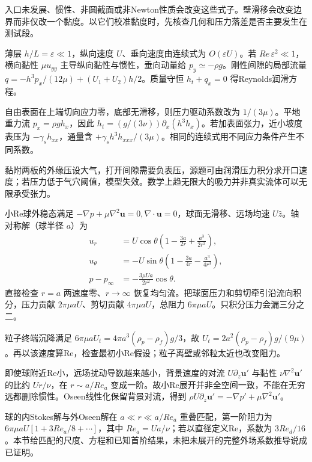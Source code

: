 入口未发展、惯性、非圆截面或非Newton性质会改变这些式子。壁滑移会改变边界而非仅改一个黏度。以它们校准黏度时，先核查几何和压力落差是否主要发生在测试段。

薄层 $h/L=\varepsilon\ll1$，纵向速度 $U$、垂向速度由连续式为 $O(\varepsilon U)$。若 $Re\,\varepsilon^2\ll1$，横向黏性 $\mu u_{yy}$ 主导纵向黏性与惯性，垂向动量给 $p_y\simeq-\rho g$。刚性间隙的局部流量 $q=-h^3p_x/(12\mu)+(U_1+U_2)h/2$。质量守恒 $h_t+q_x=0$ 得Reynolds润滑方程。

自由表面在上端切向应力零，底部无滑移，则压力驱动系数改为 $1/(3\mu)$。平地重力流 $p_x=\rho gh_x$，因此 $h_t=(g/(3\nu))\partial_x(h^3h_x)$。若加表面张力，近小坡度表压为 $-\gamma_sh_{xx}$，通量含 $+\gamma_sh^3h_{xxx}/(3\mu)$。相同的连续式用不同应力条件产生不同系数。

黏附两板的外缘压设大气，打开间隙需要负表压，源题可由润滑压力积分求开口速度；若压力低于气穴阈值，模型失效。数学上趋无限大的吸力并非真实流体可以无限承受张力。

小Re球外稳态满足 $-\nabla p+\mu\nabla^2\mathbf u=0,\nabla\cdot\mathbf u=0$，球面无滑移、远场均速 $U\hat z$。轴对称解（球半径 $a$）为
\begin{align*}
u_r&=U\cos\theta\left(1-\frac{3a}{2r}+\frac{a^3}{2r^3}\right),\\
u_\theta&=-U\sin\theta\left(1-\frac{3a}{4r}-\frac{a^3}{4r^3}\right),\\
p-p_\infty&=-\frac{3\mu Ua}{2r^2}\cos\theta.
\end{align*}
直接检查 $r=a$ 两速度零、$r\to\infty$ 恢复均匀流。把球面压力和剪切牵引沿流向积分，压力贡献 $2\pi\mu aU$、剪切贡献 $4\pi\mu aU$，总阻力 $6\pi\mu aU$。只积分压力会漏三分之二。

粒子终端沉降满足 $6\pi\mu aU_t=4\pi a^3(\rho_p-\rho_f)g/3$，故 $U_t=2a^2(\rho_p-\rho_f)g/(9\mu)$。再以该速度算Re，检查最初小Re假设；粒子离壁或邻粒太近也改变阻力。

即使球附近Re小，远场扰动导数越来越小，背景速度的对流 $U\partial_z\mathbf u'$ 与黏性 $\nu\nabla^2\mathbf u'$ 的比约 $Ur/\nu$，在 $r\sim a/Re_a$ 变成一阶。故小Re展开并非全空间一致，不能在无穷远都删除惯性。Oseen线性化保留背景对流，得到 $\rho U\partial_z\mathbf u'=-\nabla p'+\mu\nabla^2\mathbf u'$。

球的内Stokes解与外Oseen解在 $a\ll r\ll a/Re_a$ 重叠匹配，第一阶阻力为 $6\pi\mu aU[1+3Re_a/8+\cdots]$，其中 $Re_a=Ua/\nu$；若以直径定义Re，系数为 $3Re_d/16$。本节给匹配的尺度、方程和已知首阶结果，未把未展开的完整外场系数推导说成已证明。

